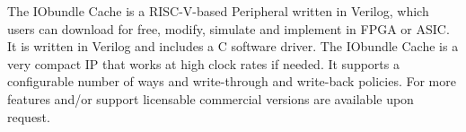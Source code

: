 The IObundle Cache is a RISC-V-based Peripheral written in Verilog, which users
can download for free, modify, simulate and implement in FPGA or ASIC. It is
written in Verilog and includes a C software driver. The IObundle Cache is a
very compact IP that works at high clock rates if needed. It supports a
configurable number of ways and write-through and write-back policies. For more
features and/or support licensable commercial versions are available upon
request.



